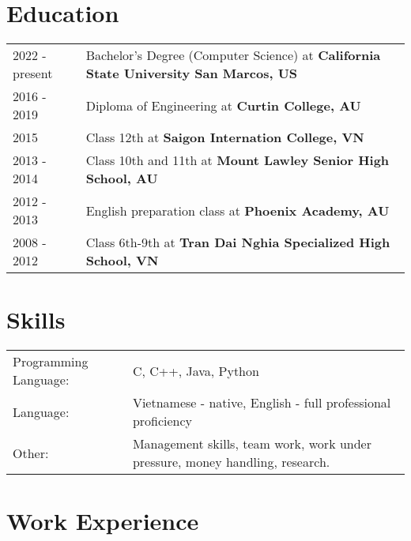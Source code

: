 \documentclass[a4paper,12pt]{article}
\begin{document}
\section{Education}
\begin{tabularx}{\linewidth}{@{}l X@{}}	
2022 - present & Bachelor's Degree (Computer Science) at \textbf{California State University San Marcos, US}\\

2016 - 2019 & Diploma of Engineering at \textbf{Curtin College, AU}\\ 

2015 & Class 12th at \textbf{Saigon Internation College, VN} \\

2013 - 2014 & Class 10th and 11th at \textbf{Mount Lawley Senior High School, AU} \\

2012 - 2013 & English preparation class at \textbf{Phoenix Academy, AU} \\

2008 - 2012 & Class 6th-9th at \textbf{Tran Dai Nghia Specialized High School, VN} \\
\end{tabularx}


\section{Skills}
\begin{tabularx}{\linewidth}{@{}l X@{}}
Programming Language: &  \normalsize{C, C++, Java, Python}\\
Language:  &  \normalsize{Vietnamese - native, English - full professional proficiency}\\  
Other:& Management skills, team work, work under pressure, money handling, research. \\
\end{tabularx}

\section{Work Experience}
\end{document}
